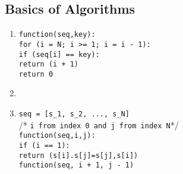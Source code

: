 \subsection*{Basics of Algorithms}
\begin{enumerate}
    \item
          \texttt{function(seq,key):} \\
          \hspace*{1cm} \texttt{for (i = N; i >= 1; i = i - 1):} \\
          \hspace*{2cm} \texttt{if (seq[i] == key):} \\
          \hspace*{3cm} \texttt{return (i + 1)} \\
          \texttt{return 0}

    \item
          \newpage
    \item
          \texttt{seq = [s\_1, s\_2, ..., s\_N]} \\

          /* \texttt{i from index 0 and j from index N}*/ \\
          \texttt{function(seq,i,j):} \\
          \hspace*{1cm} \texttt{if (i == 1):} \\
          \hspace*{2cm} \texttt{return (s[i].s[j]=s[j],s[i])} \\
          \hspace*{2cm} \texttt{function(seq, i + 1, j - 1)}
\end{enumerate}